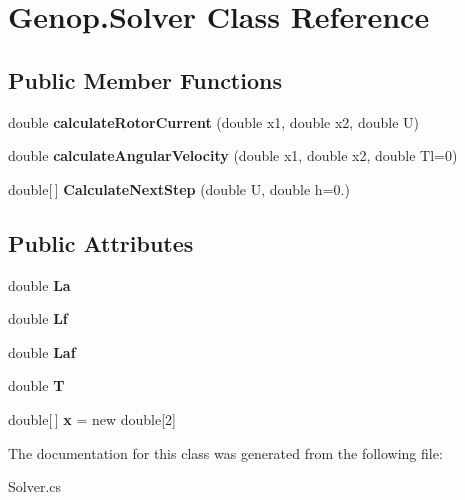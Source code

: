 \hypertarget{classGenop_1_1Solver}{}\section{Genop.\+Solver Class Reference}
\label{classGenop_1_1Solver}
\subsection*{Public Member Functions}
\begin{DoxyCompactItemize}
\item 
double {\bfseries calculate\+Rotor\+Current} (double x1, double x2, double U)\hypertarget{classGenop_1_1Solver_a284e2f18385857212e8a2cc38f14c155}{}\label{classGenop_1_1Solver_a284e2f18385857212e8a2cc38f14c155}

\item 
double {\bfseries calculate\+Angular\+Velocity} (double x1, double x2, double Tl=0)\hypertarget{classGenop_1_1Solver_ac40d9b2668f551bfc3c4e2b5f054012a}{}\label{classGenop_1_1Solver_ac40d9b2668f551bfc3c4e2b5f054012a}

\item 
double\mbox{[}$\,$\mbox{]} {\bfseries Calculate\+Next\+Step} (double U, double h=0.)\hypertarget{classGenop_1_1Solver_ad03d8a897aa8db437cc46b54872e021d}{}\label{classGenop_1_1Solver_ad03d8a897aa8db437cc46b54872e021d}

\end{DoxyCompactItemize}
\subsection*{Public Attributes}
\begin{DoxyCompactItemize}
\item 
double {\bfseries La}\hypertarget{classGenop_1_1Solver_a6d1c056f0852c4ff60804fb5ffee2bcc}{}\label{classGenop_1_1Solver_a6d1c056f0852c4ff60804fb5ffee2bcc}

\item 
double {\bfseries Lf}\hypertarget{classGenop_1_1Solver_a8f9b37a235ba4f5d508ed939ca920a6d}{}\label{classGenop_1_1Solver_a8f9b37a235ba4f5d508ed939ca920a6d}

\item 
double {\bfseries Laf}\hypertarget{classGenop_1_1Solver_a94d64291faa7206ef19499dc468afc5e}{}\label{classGenop_1_1Solver_a94d64291faa7206ef19499dc468afc5e}

\item 
double {\bfseries T}\hypertarget{classGenop_1_1Solver_a4b843e4fbca0a421ece8fffb4f59236f}{}\label{classGenop_1_1Solver_a4b843e4fbca0a421ece8fffb4f59236f}

\item 
double\mbox{[}$\,$\mbox{]} {\bfseries x} = new double\mbox{[}2\mbox{]}\hypertarget{classGenop_1_1Solver_ac15052491c6a89063cf8c6b679552c3b}{}\label{classGenop_1_1Solver_ac15052491c6a89063cf8c6b679552c3b}

\end{DoxyCompactItemize}


The documentation for this class was generated from the following file\+:\begin{DoxyCompactItemize}
\item 
Solver.\+cs\end{DoxyCompactItemize}
